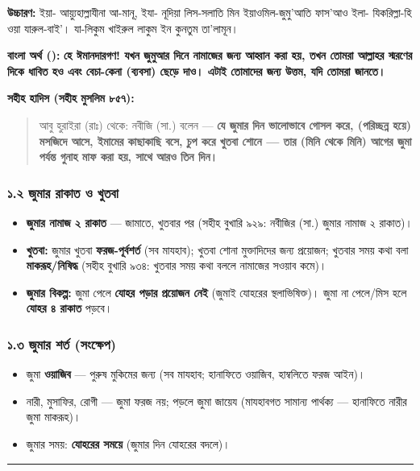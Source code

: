 \textbf{উচ্চারণ:} ইয়া- আয়্যুহাল্লাযীনা আ-মানূ, ইযা- নূদিয়া লিস-সলাতি মিন ইয়াওমিল-জুমু'আতি ফাস'আও ইলা- যিকরিল্লা-হি ওয়া যারুল-বাই'। যা-লিকুম খাইরুল লাকুম ইন কুনতুম তা'লামূন।

\textbf{বাংলা অর্থ ():}
\textbf{হে ঈমানদারগণ! যখন জুমুআর দিনে নামাজের জন্য আহ্বান করা হয়, তখন তোমরা আল্লাহর স্মরণের দিকে ধাবিত হও এবং বেচা-কেনা (ব্যবসা) ছেড়ে দাও। এটাই তোমাদের জন্য উত্তম, যদি তোমরা জানতে।}

\textbf{সহীহ হাদিস (সহীহ মুসলিম ৮৫৭):}

\begin{quote}
আবু হুরাইরা (রাঃ) থেকে: নবীজি (সা.) বলেন — \textbf{যে জুমার দিন ভালোভাবে গোসল করে, (পরিচ্ছন্ন হয়ে) মসজিদে আসে, ইমামের কাছাকাছি বসে, চুপ করে খুতবা শোনে — তার (মিনি থেকে মিনি) আগের জুমা পর্যন্ত গুনাহ মাফ করা হয়, সাথে আরও তিন দিন।}
\end{quote}

\subsubsection*{১.২ জুমার রাকাত ও খুতবা}

\begin{itemize}
\item \textbf{জুমার নামাজ ২ রাকাত} — জামাতে, খুতবার পর (সহীহ বুখারি ৯২৯: নবীজির (সা.) জুমার নামাজ ২ রাকাত)।
\item \textbf{খুতবা:} জুমার খুতবা \textbf{ফরজ-পূর্বশর্ত} (সব মাযহাব); খুতবা শোনা মুক্তাদিদের জন্য প্রয়োজন; খুতবার সময় কথা বলা \textbf{মাকরূহ/নিষিদ্ধ} (সহীহ বুখারি ৯৩৪: খুতবার সময় কথা বললে নামাজের সওয়াব কমে)।
\item \textbf{জুমার বিকল্প:} জুমা পেলে \textbf{যোহর পড়ার প্রয়োজন নেই} (জুমাই যোহরের স্থলাভিষিক্ত)। জুমা না পেলে/মিস হলে \textbf{যোহর ৪ রাকাত} পড়বে।
\end{itemize}
\subsubsection*{১.৩ জুমার শর্ত (সংক্ষেপ)}

\begin{itemize}
\item জুমা \textbf{ওয়াজিব} — পুরুষ মুকিমের জন্য (সব মাযহাব; হানাফিতে ওয়াজিব, হাম্বলিতে ফরজ আইন)।
\item নারী, মুসাফির, রোগী — জুমা ফরজ নয়; পড়লে জুমা জায়েয (মাযহাবগত সামান্য পার্থক্য — হানাফিতে নারীর জুমা মাকরূহ)।
\item জুমার সময়: \textbf{যোহরের সময়ে} (জুমার দিন যোহরের বদলে)।
\end{itemize}
\medskip\hrule\medskip

